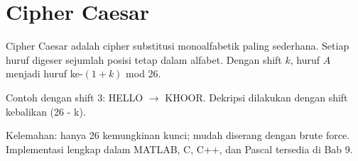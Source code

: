 \section{Cipher Caesar}

Cipher Caesar adalah cipher substitusi monoalfabetik paling sederhana. Setiap huruf digeser sejumlah posisi tetap dalam alfabet. Dengan shift $k$, huruf $A$ menjadi huruf ke-$(1+k)$ mod 26.

Contoh dengan shift 3: HELLO $\to$ KHOOR. Dekripsi dilakukan dengan shift kebalikan (26 - k).

Kelemahan: hanya 26 kemungkinan kunci; mudah diserang dengan brute force. Implementasi lengkap dalam MATLAB, C, C++, dan Pascal tersedia di Bab 9.
